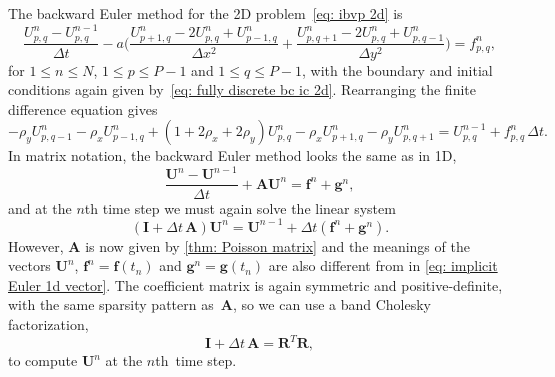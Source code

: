 The backward Euler method for the 2D problem~\eqref{eq: ibvp 2d} is
\[
\frac{U^n_{p,q}-U^{n-1}_{p,q}}{\Delta t}
	-a\biggl(\frac{U_{p+1,q}^n-2U_{p,q}^n+U_{p-1,q}^n}{\Delta x^2}
	+\frac{U_{p,q+1}^n-2U_{p,q}^n+U_{p,q-1}^n}{\Delta y^2}\biggr)=f_{p,q}^n,
\]
for $1\le n\le N$, $1\le p\le P-1$ and $1\le q\le P-1$, with the boundary 
and initial conditions again given by~\eqref{eq: fully discrete bc ic 2d}.
Rearranging the finite difference equation gives
\[
-\rho_yU^n_{p,q-1}-\rho_xU^n_{p-1,q}+(1+2\rho_x+2\rho_y)U^n_{p,q}
-\rho_xU^n_{p+1,q}-\rho_yU^n_{p,q+1}=U^{n-1}_{p,q}+f^n_{p,q}\,\Delta t.
\]
In matrix notation, the backward Euler method looks the same as in 1D,
\[
\frac{\boldsymbol{U}^n-\boldsymbol{U}^{n-1}}{\Delta t}
	+\boldsymbol{A}\boldsymbol{U}^n=\boldsymbol{f}^n+\boldsymbol{g}^n,
\]
and at the $n$th time step we must again solve the linear system
\[
(\boldsymbol{I}+\Delta t\,\boldsymbol{A})\boldsymbol{U}^n
	=\boldsymbol{U}^{n-1}+\Delta t(\boldsymbol{f}^n+\boldsymbol{g}^n).
\]
However, $\boldsymbol{A}$ is now given by \cref{thm: Poisson matrix} and the 
meanings of the vectors $\boldsymbol{U}^n$, 
$\boldsymbol{f}^n=\boldsymbol{f}(t_n)$ and 
$\boldsymbol{g}^n=\boldsymbol{g}(t_n)$ are also different from in
\eqref{eq: implicit Euler 1d vector}.  The coefficient matrix is again 
symmetric and positive-definite, with the same sparsity pattern 
as~$\boldsymbol{A}$, so we can use a band Cholesky factorization,
\begin{equation}\label{eq: backward Euler 2d Cholesky}
\boldsymbol{I}+\Delta t\,\boldsymbol{A}=\boldsymbol{R}^T\boldsymbol{R},
\end{equation}
to compute $\boldsymbol{U}^n$ at the $n$th~time step.

